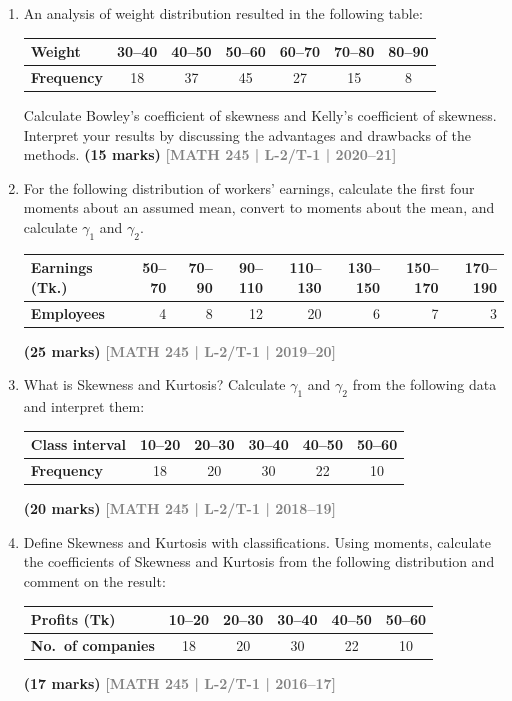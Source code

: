 \documentclass[12pt,a4paper]{article}
\newcommand{\yr}[1]{\hfill\textcolor{gray}{\small\textbf{[#1]}}}
\newcommand{\mk}[1]{\textcolor{orange!70!black}{\small\textbf{(#1 marks)}}}
\begin{document}
\begin{enumerate}\item An analysis of weight distribution resulted in the following table:
\begin{center}
\begin{tabular}{lcccccc}
\toprule
\textbf{Weight}    & 30--40 & 40--50 & 50--60 & 60--70 & 70--80 & 80--90 \\
\midrule
\textbf{Frequency} & 18 & 37 & 45 & 27 & 15 & 8 \\
\bottomrule
\end{tabular}
\end{center}
Calculate Bowley's coefficient of skewness and Kelly's coefficient of skewness. Interpret your results by discussing the advantages and drawbacks of the methods.
\mk{15} \yr{MATH 245 | L-2/T-1 | 2020--21}

\item For the following distribution of workers' earnings, calculate the first four moments about an assumed mean, convert to moments about the mean, and calculate $\gamma_{1}$ and $\gamma_{2}$.
\begin{center}
\begin{tabular}{lrrrrrrr}
\toprule
\textbf{Earnings (Tk.)} & 50--70 & 70--90 & 90--110 & 110--130 & 130--150 & 150--170 & 170--190 \\
\midrule
\textbf{Employees} & 4 & 8 & 12 & 20 & 6 & 7 & 3 \\
\bottomrule
\end{tabular}
\end{center}
\mk{25} \yr{MATH 245 | L-2/T-1 | 2019--20}


\item What is Skewness and Kurtosis? Calculate $\gamma_{1}$ and $\gamma_{2}$ from the following data and interpret them:
\begin{center}
\begin{tabular}{lccccc}
\toprule
\textbf{Class interval} & 10--20 & 20--30 & 30--40 & 40--50 & 50--60 \\
\midrule
\textbf{Frequency} & 18 & 20 & 30 & 22 & 10 \\
\bottomrule
\end{tabular}
\end{center}
\mk{20} \yr{MATH 245 | L-2/T-1 | 2018--19}

\item Define Skewness and Kurtosis with classifications. Using moments, calculate the coefficients of Skewness and Kurtosis from the following distribution and comment on the result:
\begin{center}
\begin{tabular}{lccccc}
\toprule
\textbf{Profits (Tk)} & 10--20 & 20--30 & 30--40 & 40--50 & 50--60 \\
\midrule
\textbf{No.\ of companies} & 18 & 20 & 30 & 22 & 10 \\
\bottomrule
\end{tabular}
\end{center}
\mk{17} \yr{MATH 245 | L-2/T-1 | 2016--17}


\end{enumerate}
\end{document}
